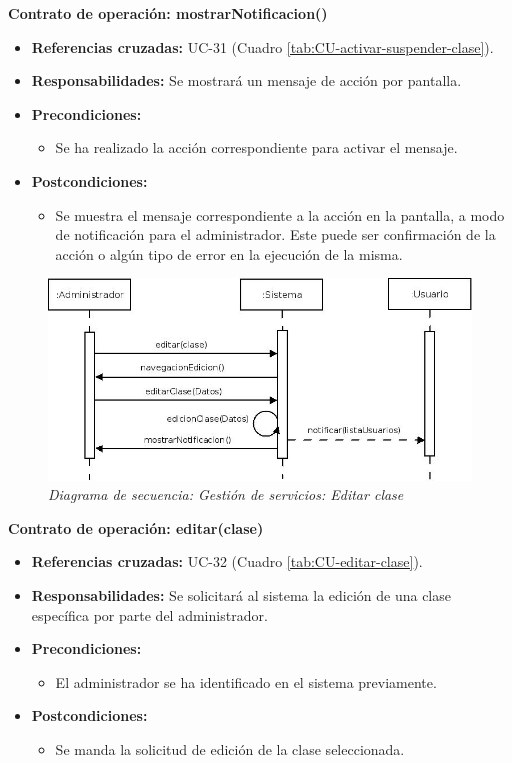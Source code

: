 \textbf{Contrato de operación: mostrarNotificacion()}
\begin{itemize}
\item \textbf{Referencias cruzadas:} UC-31 (Cuadro \ref{tab:CU-activar-suspender-clase}).
\item \textbf{Responsabilidades:} Se mostrará un mensaje de acción por pantalla.
\item \textbf{Precondiciones:} 
 \begin{itemize}
\item Se ha realizado la acción correspondiente para activar el mensaje.
\end {itemize}
\item \textbf{Postcondiciones:} 
 \begin{itemize}
\item Se muestra el mensaje correspondiente a la acción en la pantalla, a modo de notificación para el administrador. Este puede ser confirmación de la acción o algún tipo de error en la ejecución de la misma.
\end {itemize}
\end {itemize}


\vspace{10mm}

\begin{figure}[H]
\centering
  \includegraphics[scale=.50]{img/secuencias/gestion-servicios-editar-clase.jpeg}
  \caption{\textit{Diagrama de secuencia: Gestión de servicios: Editar clase}}
  \label{fig:secuencia-editar-clase}
\end{figure}

\textbf{Contrato de operación: editar(clase)}
\begin{itemize}
\item \textbf{Referencias cruzadas:} UC-32 (Cuadro \ref{tab:CU-editar-clase}).
\item \textbf{Responsabilidades:} Se solicitará al sistema la edición de una clase específica por parte del administrador.
\item \textbf{Precondiciones:} 
 \begin{itemize}
\item El administrador se ha identificado en el sistema previamente.
\end {itemize}
\item \textbf{Postcondiciones:} 
 \begin{itemize}
\item Se manda la solicitud de edición de la clase seleccionada.
\end {itemize}
\end {itemize}

